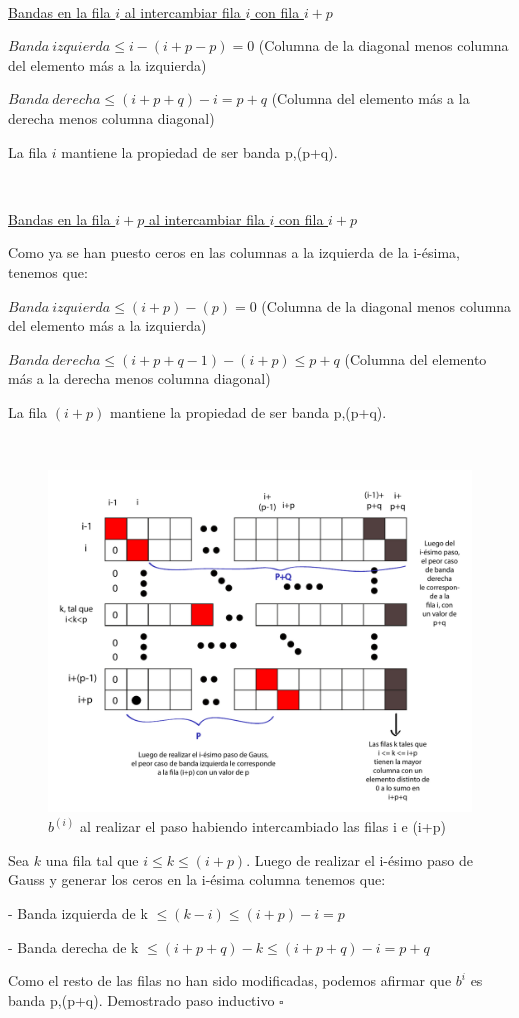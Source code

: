 ~

\underline{Bandas en la fila $i$ al intercambiar fila $i$ con fila $i+p$}

$Banda \ izquierda \leq i - (i+p-p) = 0$ (Columna de la diagonal menos columna del elemento más a la izquierda)

$Banda \ derecha \leq (i+p+q) - i = p+q$ (Columna del elemento más a la derecha menos columna diagonal)

La fila $i$ mantiene la propiedad de ser banda p,(p+q).

~

\underline{Bandas en la fila $i+p$ al intercambiar fila $i$ con fila $i+p$}

Como ya se han puesto ceros en las columnas a la izquierda de la i-ésima, tenemos que:

$Banda \ izquierda \leq (i+p) - (p) = 0$ (Columna de la diagonal menos columna del elemento más a la izquierda)

$Banda \ derecha \leq (i+p+q-1) - (i+p) \leq p+q$ (Columna del elemento más a la derecha menos columna diagonal)

La fila $(i+p)$ mantiene la propiedad de ser banda p,(p+q).

~

\begin{figure}[!h]
	\begin{center}
		  \includegraphics[scale=0.5]{Imagenes/im_10.pdf}
		  \caption{$b^{(i)}$ al realizar el paso habiendo intercambiado las filas i e (i+p)}
		  \label{fig:contra1}
	\end{center}
\end{figure}

Sea $k$ una fila tal que $i \leq k \leq (i+p)$. Luego de realizar el i-ésimo paso de Gauss y generar los ceros en la 
i-ésima columna tenemos que:

- Banda izquierda de k $\leq (k-i) \leq (i+p)-i = p$

- Banda derecha de k $ \leq (i+p+q)-k \leq (i+p+q)-i = p+q $

Como el resto de las filas no han sido modificadas, podemos afirmar que $b^{i}$ es banda p,(p+q). 
Demostrado paso inductivo $\square$
